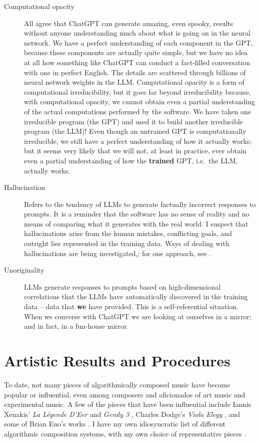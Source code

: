 \documentclass[11pt]{scrartcl}
\begin{document}
\begin{description}
\item[Computational opacity] All agree that ChatGPT can generate amazing, even spooky, results without anyone understanding much about what is going on in the neural network. We have a perfect understanding of each component in the GPT, because these components are actually quite simple, but we have no idea at all how something like ChatGPT can conduct a fact-filled conversation with one in perfect English. The details are scattered through billions of neural network weights in the LLM. Computational opacity is a form of computational irreducibility, but it goes far beyond irreducibility because, with computational opacity, we cannot obtain even a partial understanding of the actual computations performed by the software. We have taken one irreducible program (the GPT) and used it to build another irreducible program (the LLM)! Even though an untrained GPT is computationally irreducible, we still have a perfect understanding of how it actually works; but it seems very likely that we will not, at least in practice, ever obtain even a partial understanding of how the  \textbf{trained} GPT, i.e.\ the LLM, actually works.
\item [Hallucination] Refers to the tendency of LLMs to generate factually incorrect responses to prompts. It is a reminder that the software has no sense of reality and no means of comparing what it generates with the real world. I suspect that hallucinations arise from the human mistakes, conflicting goals, and outright lies represented in the training data. Ways of dealing with hallucinations are being investigated,; for one approach, see \parencite{christiano2017deep}.
\item [Unoriginality] LLMs generate responses to prompts based on high-dimensional correlations that the LLMs have automatically discovered in the training data -- data that \textbf{we} have provided. This is a self-referential situation. When we converse with ChatGPT we are looking at ourselves in a mirror; and in fact, in a fun-house mirror.
\end{description}

\section*{Artistic Results and Procedures}

To date, not many pieces of algorithmically composed music have become popular or influential, even among composers and aficionados of art music and experimental music. A few of the pieces that have been influential include Iannis Xenakis' \emph{La Légende D'Eer} \parencite{Solr-8143160} and \emph{Gendy 3} \parencite{gendy3},  Charles Dodge's \emph{Viola Elegy} \parencite{violaelegy}, and some of Brian Eno's works \parencite{eno1996generative, enochilvers}. I have my own idiosyncratic list of different algorithmic composition systems, with my own choice of representative pieces \parencite{rant}.
\end{document}

